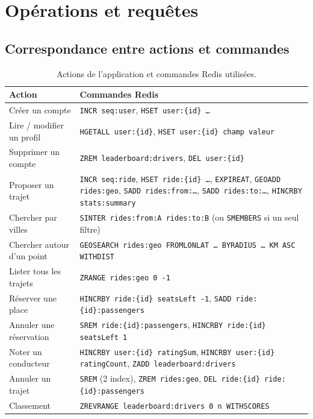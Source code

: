 \documentclass[11pt,a4paper]{article}
\begin{document}
\section{Op\'erations et requ\^etes}

\subsection{Correspondance entre actions et commandes}
\begin{table}[htbp]\centering
\begin{tabularx}{\textwidth}{@{}L{3.7cm}X@{}}
\toprule
\textbf{Action} & \textbf{Commandes Redis}\\
\midrule
Cr\'eer un compte & \texttt{INCR seq:user}, \texttt{HSET user:\{id\} \ldots}\\
Lire / modifier un profil & \texttt{HGETALL user:\{id\}}, \texttt{HSET user:\{id\} champ valeur}\\
Supprimer un compte & \texttt{ZREM leaderboard:drivers}, \texttt{DEL user:\{id\}}\\
Proposer un trajet & \texttt{INCR seq:ride}, \texttt{HSET ride:\{id\} \ldots}, \texttt{EXPIREAT}, \texttt{GEOADD rides:geo}, \texttt{SADD rides:from:\ldots}, \texttt{SADD rides:to:\ldots}, \texttt{HINCRBY stats:summary}\\
Chercher par villes & \texttt{SINTER rides:from:A rides:to:B} (ou \texttt{SMEMBERS} si un seul filtre)\\
Chercher autour d'un point & \texttt{GEOSEARCH rides:geo FROMLONLAT \ldots\ BYRADIUS \ldots\ KM ASC WITHDIST}\\
Lister tous les trajets & \texttt{ZRANGE rides:geo 0 -1}\\
R\'eserver une place & \texttt{HINCRBY ride:\{id\} seatsLeft -1}, \texttt{SADD ride:\{id\}:passengers}\\
Annuler une r\'eservation & \texttt{SREM ride:\{id\}:passengers}, \texttt{HINCRBY ride:\{id\} seatsLeft 1}\\
Noter un conducteur & \texttt{HINCRBY user:\{id\} ratingSum}, \texttt{HINCRBY user:\{id\} ratingCount}, \texttt{ZADD leaderboard:drivers}\\
Annuler un trajet & \texttt{SREM} (2 index), \texttt{ZREM rides:geo}, \texttt{DEL ride:\{id\} ride:\{id\}:passengers}\\
Classement & \texttt{ZREVRANGE leaderboard:drivers 0 n WITHSCORES}\\
\bottomrule
\end{tabularx}
\caption{Actions de l'application et commandes Redis utilis\'ees.}
\end{table}
\end{document}
